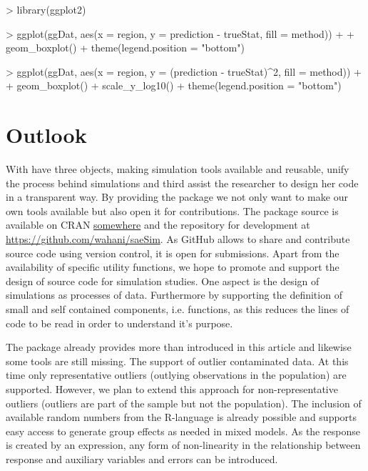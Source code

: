 \documentclass[article]{ajs}
\begin{document}
\begin{Schunk}
\begin{Sinput}
> library(ggplot2)
\end{Sinput}
\end{Schunk}

\begin{Schunk}
\begin{Sinput}
> ggplot(ggDat, aes(x = region, y = prediction - trueStat, fill = method)) + 
+   geom_boxplot() + theme(legend.position = "bottom")
\end{Sinput}
\end{Schunk}


\begin{Schunk}
\begin{Sinput}
> ggplot(ggDat, aes(x = region, y = (prediction - trueStat)^2, fill = method)) + 
+   geom_boxplot() + scale_y_log10() + theme(legend.position = "bottom")
\end{Sinput}
\end{Schunk}


  
\section{Outlook}
\label{sec:outlook}
With  have three objects, making simulation tools available and reusable, unify the process behind simulations and third assist the researcher to design her code in a transparent way. By providing the package we not only want to make our own tools available but also open it for contributions. The package source is available on CRAN \url{somewhere} and the repository for development at \url{https://github.com/wahani/saeSim}. As GitHub allows to share and contribute source code using version control, it is open for submissions. Apart from the availability of specific utility functions, we hope to promote and support the design of source code for simulation studies. One aspect is the design of simulations as processes of data. Furthermore by supporting the definition of small and self contained components, i.e. functions, as this reduces the lines of code to be read in order to understand it's purpose. 

The package already provides more than introduced in this article and likewise some tools are still missing. The support of outlier contaminated data. At this time only representative outliers (outlying observations in the population) are supported. However, we plan to extend this approach for non-representative outliers (outliers are part of the sample but not the population). The inclusion of available random numbers from the R-language is already possible and supports easy access to generate group effects as needed in mixed models. As the response is created by an  expression, any form of non-linearity in the relationship between response and auxiliary variables and errors can be introduced.
\end{document}
